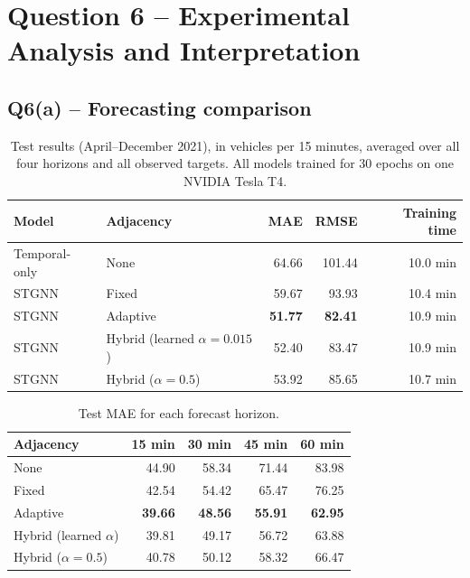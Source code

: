 \documentclass[11pt, a4paper]{article}
\begin{document}
\section*{Question 6 -- Experimental Analysis and Interpretation}

\subsection*{Q6(a) -- Forecasting comparison}

\begin{table}[H]
\centering
\small
\begin{tabular}{@{}llrrr@{}}
\toprule
Model & Adjacency & MAE & RMSE & Training time \\
\midrule
Temporal-only & None & 64.66 & 101.44 & 10.0 min \\
STGNN & Fixed & 59.67 & 93.93 & 10.4 min \\
STGNN & Adaptive & \textbf{51.77} & \textbf{82.41} & 10.9 min \\
STGNN & Hybrid (learned $\alpha = 0.015$) & 52.40 & 83.47 & 10.9 min \\
STGNN & Hybrid ($\alpha = 0.5$) & 53.92 & 85.65 & 10.7 min \\
\bottomrule
\end{tabular}
\caption{Test results (April--December 2021), in vehicles per 15 minutes, averaged over all four horizons and all observed targets. All models trained for 30 epochs on one NVIDIA Tesla T4.}
\label{tab:final}
\end{table}

\begin{table}[H]
\centering
\small
\begin{tabular}{@{}lrrrr@{}}
\toprule
Adjacency & 15 min & 30 min & 45 min & 60 min \\
\midrule
None                        & 44.90 & 58.34 & 71.44 & 83.98 \\
Fixed                       & 42.54 & 54.42 & 65.47 & 76.25 \\
Adaptive                    & \textbf{39.66} & \textbf{48.56} & \textbf{55.91} & \textbf{62.95} \\
Hybrid (learned $\alpha$)   & 39.81 & 49.17 & 56.72 & 63.88 \\
Hybrid ($\alpha = 0.5$)     & 40.78 & 50.12 & 58.32 & 66.47 \\
\bottomrule
\end{tabular}
\caption{Test MAE for each forecast horizon.}
\label{tab:horizon}
\end{table}
\end{document}
